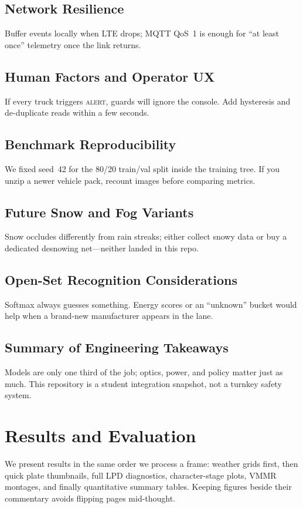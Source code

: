 \documentclass[10pt, conference]{IEEEtran}
\begin{document}
\subsection{Network Resilience}
Buffer events locally when LTE drops; MQTT QoS~1 is enough for ``at least once'' telemetry once the link returns.

\subsection{Human Factors and Operator UX}
If every truck triggers \textsc{alert}, guards will ignore the console. Add hysteresis and de-duplicate reads within a few seconds.

\subsection{Benchmark Reproducibility}
We fixed seed~42 for the 80/20 train/val split inside the training tree. If you unzip a newer vehicle pack, recount images before comparing metrics.

\subsection{Future Snow and Fog Variants}
Snow occludes differently from rain streaks; either collect snowy data or buy a dedicated desnowing net---neither landed in this repo.

\subsection{Open-Set Recognition Considerations}
Softmax always guesses something. Energy scores or an ``unknown'' bucket would help when a brand-new manufacturer appears in the lane.

\subsection{Summary of Engineering Takeaways}
Models are only one third of the job; optics, power, and policy matter just as much. This repository is a student integration snapshot, not a turnkey safety system.

\clearpage
\section{Results and Evaluation}
\label{sec:res}
We present results in the same order we process a frame: weather grids first, then quick plate thumbnails, full LPD diagnostics, character-stage plots, VMMR montages, and finally quantitative summary tables. Keeping figures beside their commentary avoids flipping pages mid-thought.
\end{document}

